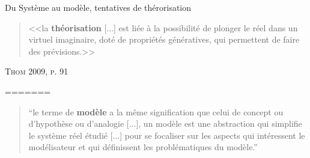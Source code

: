 \documentclass[newPxFont]{beamer}
\begin{document}
\begin{frame}[c]{Du Système au modèle, tentatives de thérorisation}
  \vspace{-1em}
  \begin{quote}
    <<la \textbf{théorisation} [...] est liée à la possibilité de plonger le réel dans un virtuel imaginaire, doté de propriétés génératives, qui permettent de faire des prévisions.>>
  \end{quote}
  \hspace*{\fill}\textsc{Thom 2009, p. 91}
  \vspace{-0.5em}
  \begin{figure}
   	\centering
   		\hspace{0.2em} %
      \hspace{0.2em} %
   		\hspace{0.2em} %
  \end{figure}
=======
\vspace{-1em}
\begin{quote}
  \enquote{le terme de \textbf{modèle} a la même signification que celui de concept ou d'hypothèse ou d'analogie [...], un modèle est une abstraction qui simplifie le système réel étudié [...] pour se focaliser sur les aspects qui intéressent le modélisateur et qui définissent les problématiques du modèle.}
\end{quote}


\end{frame}
\end{document}
